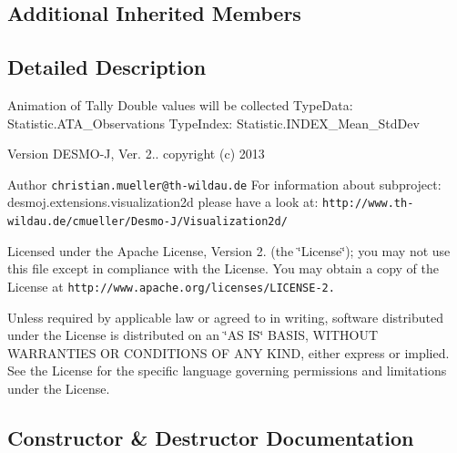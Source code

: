 \subsection*{Additional Inherited Members}


\subsection{Detailed Description}
Animation of Tally Double values will be collected Type\-Data\-: Statistic.\-A\-T\-A\-\_\-\-Observations Type\-Index\-: Statistic.\-I\-N\-D\-E\-X\-\_\-\-Mean\-\_\-\-Std\-Dev

\begin{DoxyVersion}{Version}
D\-E\-S\-M\-O-\/\-J, Ver. 2.. copyright (c) 2013 
\end{DoxyVersion}
\begin{DoxyAuthor}{Author}
{\tt christian.\-mueller@th-\/wildau.\-de} For information about subproject\-: desmoj.\-extensions.\-visualization2d please have a look at\-: {\tt http\-://www.\-th-\/wildau.\-de/cmueller/\-Desmo-\/\-J/\-Visualization2d/}
\end{DoxyAuthor}
Licensed under the Apache License, Version 2. (the \char`\"{}\-License\char`\"{}); you may not use this file except in compliance with the License. You may obtain a copy of the License at {\tt http\-://www.\-apache.\-org/licenses/\-L\-I\-C\-E\-N\-S\-E-\/2.}

Unless required by applicable law or agreed to in writing, software distributed under the License is distributed on an \char`\"{}\-A\-S I\-S\char`\"{} B\-A\-S\-I\-S, W\-I\-T\-H\-O\-U\-T W\-A\-R\-R\-A\-N\-T\-I\-E\-S O\-R C\-O\-N\-D\-I\-T\-I\-O\-N\-S O\-F A\-N\-Y K\-I\-N\-D, either express or implied. See the License for the specific language governing permissions and limitations under the License. 

\subsection{Constructor \& Destructor Documentation}
